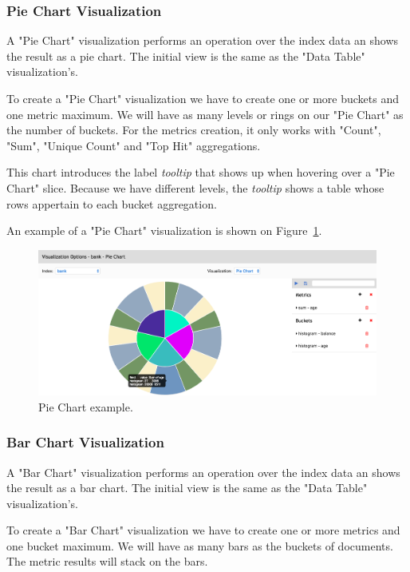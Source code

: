 \documentclass[a4paper, 12pt, english]{book}
\begin{document}
\subsubsection{Pie Chart Visualization}
\label{sec:pie-chart-visualization}
A "Pie Chart" visualization performs an operation over the index data an shows the result as a pie chart. The initial view is the same as the "Data Table" visualization's.

To create a "Pie Chart" visualization we have to create one or more buckets and one metric maximum. We will have as many levels or rings on our "Pie Chart" as the number of buckets. For the metrics creation, it only works with "Count", "Sum", "Unique Count" and "Top Hit" aggregations.

This chart introduces the label \textit{tooltip} that shows up when hovering over a "Pie Chart" slice. Because we have different levels, the \textit{tooltip} shows a table whose rows appertain to each bucket aggregation.

An example of a "Pie Chart" visualization is shown on Figure~\ref{fig:pie-chart-calculation}.

\begin{figure}
  \centering
  \includegraphics[width=16cm, keepaspectratio]{img/pie-chart-calculation.png}
  \caption{Pie Chart example.}
  \label{fig:pie-chart-calculation}
\end{figure}

\subsubsection{Bar Chart Visualization}
\label{sec:bar-chart-visualization}
A "Bar Chart" visualization performs an operation over the index data an shows the result as a bar chart. The initial view is the same as the "Data Table" visualization's.

To create a "Bar Chart" visualization we have to create one or more metrics and one bucket maximum. We will have as many bars as the buckets of documents. The metric results will stack on the bars.
\end{document}
